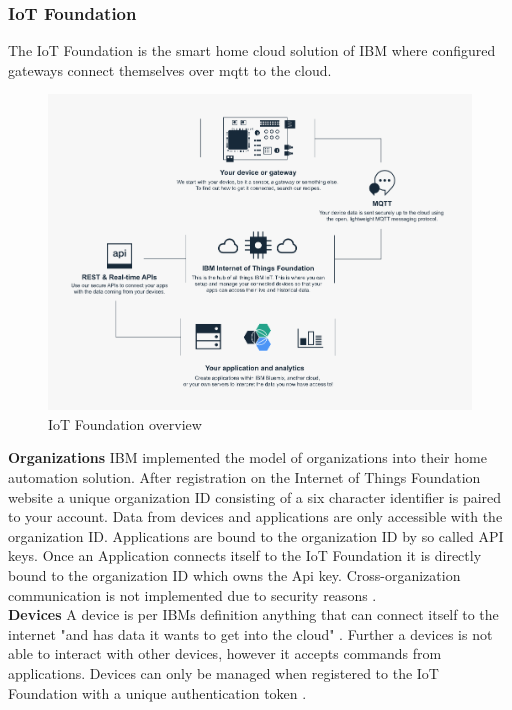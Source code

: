 		\subsubsection{IoT Foundation}
			The IoT Foundation is the smart home cloud solution of IBM where configured gateways connect themselves over mqtt to the cloud.\\ 

			\begin{figure}[h]
				\centering
					\includegraphics[width=.9\textwidth]{images/theory/IoTFoundationOverview.png}
				\caption{IoT Foundation overview \parencite{IoTFoundationOverview}}
				\label{fig:SmartHomeLandscape}
			\end{figure} 

			\textbf{Organizations}
				IBM implemented the model of organizations into their home automation solution. After registration on the Internet of Things Foundation website a unique organization ID consisting of a  six character identifier is paired to your account. Data from devices and applications are only accessible with the organization ID. Applications are bound to the organization ID by so called API keys. Once an Application connects itself to the IoT Foundation it is directly bound to the organization ID which owns the Api key. Cross-organization communication is not implemented due to security reasons \parencite{IoTFoundationOverview}.\\

			\textbf{Devices}
				A device is per IBMs definition anything that can connect itself to the internet "and has data it wants to get into the cloud" \parencite{IoTFoundationOverview}. Further a devices is not able to interact with other devices, however it accepts commands from applications. Devices can only be managed when registered to the IoT Foundation with a unique authentication token \parencite{IoTFoundationOverview}.\\

